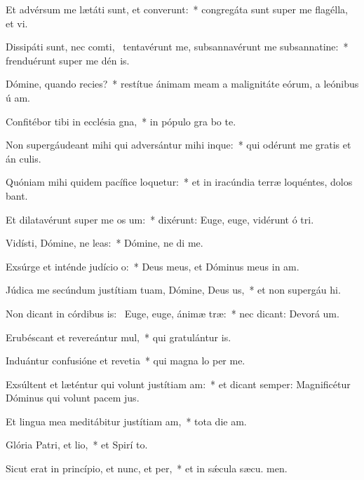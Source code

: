 \item Et advérsum me lætáti sunt, et converunt:~* congregáta sunt super me flagélla, et vi.
\item Dissipáti sunt, nec comti,~\pscross{} tentavérunt me, subsannavérunt me subsannatine:~* frenduérunt super me dén is.
\item Dómine, quando recies?~* restítue ánimam meam a malignitáte eórum, a leónibus ú am.
\item Confitébor tibi in ecclésia gna,~* in pópulo gra bo te.
\item Non supergáudeant mihi qui adversántur mihi inque:~* qui odérunt me gratis et án culis.
\item Quóniam mihi quidem pacífice loquetur:~* et in iracúndia terræ loquéntes, dolos bant.
\item Et dilatavérunt super me os um:~* dixérunt: Euge, euge, vidérunt ó tri.
\item Vidísti, Dómine, ne leas:~* Dómine, ne di  me.
\item Exsúrge et inténde judício o:~* Deus meus, et Dóminus meus in  am.
\item Júdica me secúndum justítiam tuam, Dómine, Deus us,~* et non supergáu hi.
\item Non dicant in córdibus is:~\pscross{} Euge, euge, ánimæ træ:~* nec dicant: Devorá um.
\item Erubéscant et revereántur mul,~* qui gratulántur  is.
\item Induántur confusióne et revetia~* qui magna lo per me.
\item Exsúltent et læténtur qui volunt justítiam am:~* et dicant semper: Magnificétur Dóminus qui volunt pacem  jus.
\item Et lingua mea meditábitur justítiam am,~* tota die  am.
\item Glória Patri, et lio,~* et Spirí to.
\item Sicut erat in princípio, et nunc, et per,~* et in sǽcula sæcu. men.
